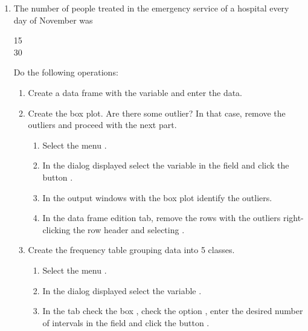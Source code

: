 \begin{enumerate}[leftmargin=*]
\item The number of people treated in the emergency service of a hospital every day of November was
\begin{center}
15               \\
30              
\end{center}
Do the following operations: 
\begin{enumerate}
\item Create a data frame with the variable  and enter the data.

\item Create the box plot. Are there some outlier? In that case, remove the outliers and proceed with the next part.
\begin{indication}
\begin{enumerate}
\item Select the menu .
\item In the dialog displayed select the variable  in the field  and
click the button .
\item In the output windows with the box plot identify the outliers.
\item In the data frame edition tab, remove the rows with the outliers right-clicking the row header and selecting
.
\end{enumerate}
\end{indication}

\item Create the frequency table grouping data into 5 classes.
\begin{indication}
\begin{enumerate}
\item Select the menu .
\item In the dialog displayed select the variable .
\item In the  tab check the box , check the option , enter the desired number of intervals in the field  and
click the button .
\end{enumerate}
\end{indication}


\end{enumerate}
\end{enumerate}
